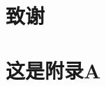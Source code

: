 \documentclass[master]{cugthesis}
\begin{document}
     
     

    
    
    
    
    
    

    \backmatter
    \chapter{致谢}

    \appendix
    \chapter{这是附录A}
\end{document}

